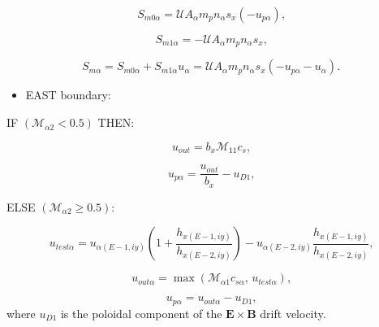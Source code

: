 \documentclass[11pt]{article}
\begin{document}
\bigskip

\begin{equation}
S_{m0\alpha}=\mathcal{U}A_{\alpha}m_{p}n_{\alpha}s_{x}\left( -u_{p\alpha
}\right) \text{,}   \label{c112}
\end{equation}

\begin{equation}
S_{m1\alpha}=-\mathcal{U}A_{\alpha}m_{p}n_{\alpha}s_{x}\text{,} 
\label{c113}
\end{equation}

\begin{equation}
S_{m\alpha}=S_{m0\alpha}+S_{m1\alpha}u_{\alpha}=\mathcal{U}%
A_{\alpha}m_{p}n_{\alpha}s_{x}\left( -u_{p\alpha}-u_{\alpha}\right) \text{.} 
\label{c114}
\end{equation}

\bigskip

\begin{itemize}
\item  EAST boundary:
\end{itemize}

\bigskip

IF $\left( \mathcal{M}_{\alpha2}<0.5\right) $ THEN:

\begin{equation}
u_{out}=b_{x}\mathcal{M}_{11}c_{s}\text{,}   \label{c115}
\end{equation}

\begin{equation}
u_{p\alpha}=\frac{u_{out}}{b_{x}}-u_{D1}\text{,}   \label{c116}
\end{equation}

\bigskip

ELSE $\left( \mathcal{M}_{\alpha2}\geq0.5\right) $:

\begin{equation}
u_{test\alpha}=u_{\alpha\left( E-1,iy\right) }\left( 1+\frac{h_{x\left(
E-1,iy\right) }}{h_{x\left( E-2,iy\right) }}\right) -u_{\alpha\left(
E-2,iy\right) }\frac{h_{x\left( E-1,iy\right) }}{h_{x\left( E-2,iy\right) }}%
\text{,}   \label{c117}
\end{equation}

\begin{equation}
u_{out\alpha}=\max\left( \mathcal{M}_{\alpha1}c_{s\alpha}\text{, }%
u_{test\alpha}\right) \text{,}   \label{c118}
\end{equation}

\begin{equation}
u_{p\alpha}=u_{out\alpha}-u_{D1}\text{,}   \label{c119}
\end{equation}
where $u_{D1}$ is the poloidal component of the $\mathbf{E\times B}$ drift
velocity.
\end{document}
